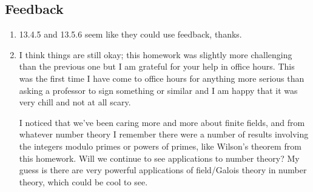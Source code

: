 \documentclass[11pt]{article}
\begin{document}
\subsection*{Feedback}
\begin{enumerate}
    \item 13.4.5 and 13.5.6 seem like they could use feedback, thanks.
    \item I think things are still okay; this homework was slightly more challenging than the previous one but I am grateful for your help in office hours. This was the first time I have come to office hours for anything more serious than asking a professor to sign something or similar and I am happy that it was very chill and not at all scary.
    
    I noticed that we've been caring more and more about finite fields, and from whatever number theory I remember there were a number of results involving the integers modulo primes or powers of primes, like Wilson's theorem from this homework. Will we continue to see applications to number theory? My guess is there are very powerful applications of field/Galois theory in number theory, which could be cool to see.
\end{enumerate}
\end{document}
